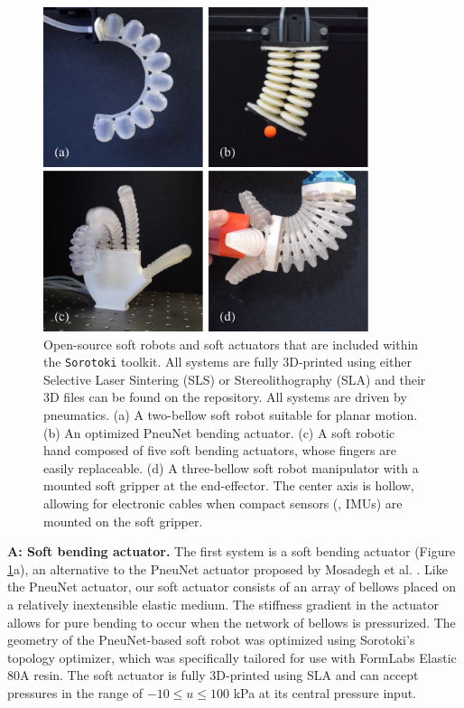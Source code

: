 \begin{figure}[!t]
    \centering
    \includegraphics*[width=0.85\textwidth]{./pdf/thesis-figure-6-1.pdf}
    \caption{\small Open-source soft robots and soft actuators that are included within the \texttt{Sorotoki} toolkit. All systems are fully 3D-printed using either Selective Laser Sintering (SLS) or Stereolithography (SLA) and their 3D files can be found on the repository. All systems are driven by pneumatics. (a) A two-bellow soft robot suitable for planar motion. (b) An optimized PneuNet bending actuator. (c) A soft robotic hand composed of five soft bending actuators, whose fingers are easily replaceable. (d) A three-bellow soft robot manipulator with a mounted soft gripper at the end-effector. The center axis is hollow, allowing for electronic cables when compact sensors (\eg, IMUs) are mounted on the soft gripper.}
    \vspace{-3mm}
    \label{fig:C5:examplebots}
\end{figure}
%  

\textbf{A: Soft bending actuator.} The first system is a soft bending actuator (Figure \ref{fig:C5:examplebots}a), an alternative to the PneuNet actuator proposed by Mosadegh et al. \cite{Mosadegh2014}. Like the PneuNet actuator, our soft actuator consists of an array of bellows placed on a relatively inextensible elastic medium. The stiffness gradient in the actuator allows for pure bending to occur when the network of bellows is pressurized. The geometry of the PneuNet-based soft robot was optimized using Sorotoki's topology optimizer, which was specifically tailored for use with FormLabs Elastic 80A resin. The soft actuator is fully 3D-printed using SLA and can accept pressures in the range of $-10 \le u \le 100$ kPa at its central pressure input. \\

